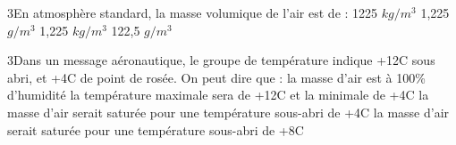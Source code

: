 {3}{En atmosphère standard, la masse volumique de l'air est de :}
{1225 $kg/m^3$}
{1,225 $g/m^3$}
{1,225 $kg/m^3$}
{122,5 $g/m^3$} 
{}

{3}{Dans un message aéronautique, le groupe de température indique +12\textdegree C sous abri, et +4\textdegree C de point de rosée. On peut dire que :}
{la masse d'air est à 100\% d'humidité}
{la température maximale sera de +12\textdegree C et la minimale de +4\textdegree C}
{la masse d'air serait saturée pour une température sous-abri de +4\textdegree C}
{la masse d'air serait saturée pour une température sous-abri de +8\textdegree C} 
{}

 
 
 

